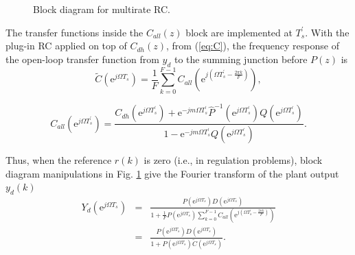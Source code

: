\documentclass [11pt, proquest] {uwthesis}[2020/02/24]
\begin{document}
\begin{figure}[!ht]
\begin{centering}
\par\end{centering}
\caption{\label{fig:Block-diagram-RC-1}Block diagram for multirate RC.}
\end{figure}

The transfer functions inside the $C_{all}(z)$ block are implemented
at $T_{s}^{'}$. With the plug-in RC applied on top of $C_{dh}(z)$,
from (\ref{eq:C}), the frequency response of the open-loop transfer
function from $y_{d}$ to the summing junction before $P(z)$ is
\begin{equation}
\tilde{C}(\text{e}^{j\Omega T_{s}})=\frac{1}{F}\sum_{k=0}^{F-1}C_{all}(\text{e}^{j(\Omega T_{s}^{'}-\frac{2\pi k}{F})}),\label{eq:Yd-1}
\end{equation}

\noindent
\begin{equation}
C_{all}(\text{e}^{j\Omega T_{s}^{'}})=\frac{C_{dh}(\text{e}^{j\Omega T_{s}^{'}})+\text{e}^{-jm\Omega T_{s}^{'}}\hat{P}^{-1}(\text{e}^{j\Omega T_{s}^{'}})Q(\text{e}^{j\Omega T_{s}^{'}})}{1-\text{e}^{-jm\Omega T_{s}^{'}}Q(\text{e}^{j\Omega T_{s}^{'}})}.\label{eq:C-all-fre}
\end{equation}

Thus, when the reference $r(k)$ is zero (i.e., in regulation problems),
block diagram manipulations in Fig. \ref{fig:Block-diagram-RC-1}
give the Fourier transform of the plant output $y_{d}(k)$
\begin{eqnarray}
Y_{d}(\text{e}^{j\Omega T_{s}}) & = & \frac{P(\text{e}^{j\Omega T_{s}})D(\text{e}^{j\Omega T_{s}})}{1+\frac{1}{F}P(\text{e}^{j\Omega T_{s}})\sum_{k=0}^{F-1}C_{all}(\text{e}^{j(\Omega T_{s}^{'}-\frac{2\pi k}{F})})}\nonumber \\
 & = & \frac{P(\text{e}^{j\Omega T_{s}})D(\text{e}^{j\Omega T_{s}})}{1+P(\text{e}^{j\Omega T_{s}})\tilde{C}(\text{e}^{j\Omega T_{s}})}.\label{eq:Yd}
\end{eqnarray}
\end{document}
